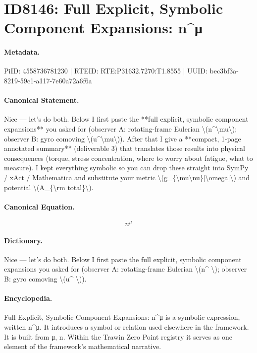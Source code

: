 \section*{ID8146: Full Explicit, Symbolic Component Expansions: n\textasciicircum{}μ}
\paragraph{Metadata.}
PiID: 4558736781230 | RTEID: RTE:P31632.7270:T1.8555 | UUID: bec3bf3a-8219-59c1-a117-7e60a72a6f6a

\paragraph{Canonical Statement.}
Nice — let’s do both. Below I first paste the **full explicit, symbolic component expansions** you asked for (observer A: rotating-frame Eulerian \textbackslash{}(n\textasciicircum{}\textbackslash{}mu\textbackslash{}); observer B: gyro comoving \textbackslash{}(u\textasciicircum{}\textbackslash{}mu\textbackslash{})). After that I give a **compact, 1-page annotated summary** (deliverable 3) that translates those results into physical consequences (torque, stress concentration, where to worry about fatigue, what to measure). I kept everything symbolic so you can drop these straight into SymPy / xAct / Mathematica and substitute your metric \textbackslash{}(g\_\{\textbackslash{}mu\textbackslash{}nu\}[\textbackslash{}omega]\textbackslash{}) and potential \textbackslash{}(A\_\{\textbackslash{}rm total\}\textbackslash{}).

\paragraph{Canonical Equation.}
\[
n^\mu
\]

\paragraph{Dictionary.}
Nice — let’s do both. Below I first paste the full explicit, symbolic component expansions you asked for (observer A: rotating-frame Eulerian \textbackslash{}(n\textasciicircum{} \textbackslash{}); observer B: gyro comoving \textbackslash{}(u\textasciicircum{} \textbackslash{})).

\paragraph{Encyclopedia.}
Full Explicit, Symbolic Component Expansions: n\textasciicircum{}μ is a symbolic expression, written n\textasciicircum{}μ. It introduces a symbol or relation used elsewhere in the framework. It is built from μ, n. Within the Trawin Zero Point registry it serves as one element of the framework's mathematical narrative.
